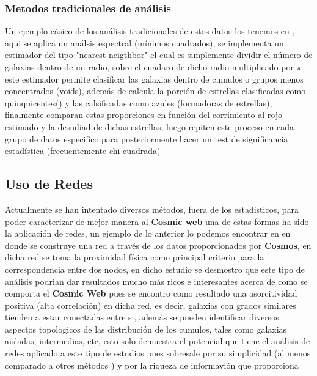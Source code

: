 \documentclass[11pt,letterpaper]{article}
\begin{document}
\subsubsection{Metodos tradicionales de an\'alisis}
Un ejemplo c\'asico de los an\'alisis tradicionales de estos datos los tenemos en \cite{scoville2013}, aqui se aplica un an\'alsis espectral (m\'inimos cuadrados), se implementa un estimador del tipo "nearest-neigthbor" el cual es simplemente dividir el n\'umero de galaxias dentro de un radio, sobre el cuadaro de dicho radio multiplicado por $\pi$ este estimador permite
clasificar las galaxias dentro de cumulos o grupos menos concentrados (voids), adem\'as de calcula la porci\'on de estrellas clasificadas como quinquicentes() y las calsificadas como azules (formadoras de estrellas), finalmente comparan estas proporciones en funci\'on del corrimiento al rojo estimado y la desndiad de dichas estrellas, luego repiten este proceso en cada grupo de datos especifico para posteriormente hacer un
test de significancia estad\'istica (frecuentemente chi-cuadrada) 
\subsection{Uso de Redes}
Actualmente se han intentado diversos m\'etodos, fuera de los estadisticos, para poder caracterizar de mejor manera al \textbf{Cosmic web} una de estas formas ha sido la aplicaci\'on de redes, un ejemplo de lo anterior lo podemos encontrar en \cite{Network}
en donde se construye una red a trav\'es de los datos proporcionados por \textbf{Cosmos}, en dicha red se toma la proximidad f\'isica como principal criterio para la correspondencia entre dos nodos, en dicho estudio se desmostro que este tipo de an\'alisis podrian dar resultados mucho m\'as ricos e interesantes acerca de como se comporta el \textbf{Cosmic Web} pues 
se encontro como resultado una asorcitividad positiva (alta correlaci\'on) en dicha red, es decir, galaxias con grados similares tienden a estar conectadas entre si, adem\'as se pueden identificar diversos aspectos topologicos de las distribuci\'on de los cumulos, tales como galaxias aisladas, intermedias, etc, esto solo demuestra el potencial que tiene el an\'alisis de redes aplicado a este tipo de estudios
pues sobresale por su simplicidad (al menos comparado a otros m\'etodos ) y por la riqueza de informavi\'on que proporciona   
\end{document}
